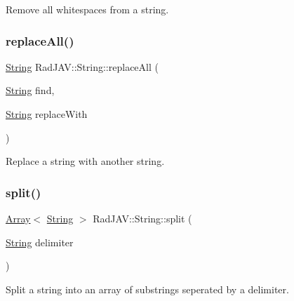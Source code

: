 Remove all whitespaces from a string. 

\mbox{\label{class_rad_j_a_v_1_1_string_a8631dd8fc8ed789ab959315f7e73ddb4}} 
\subsubsection{\texorpdfstring{replace\+All()}{replaceAll()}}
{\footnotesize\ttfamily \mbox{\hyperlink{class_rad_j_a_v_1_1_string}{String}} Rad\+J\+A\+V\+::\+String\+::replace\+All (\begin{DoxyParamCaption}\item[{\mbox{\hyperlink{class_rad_j_a_v_1_1_string}{String}}}]{find,  }\item[{\mbox{\hyperlink{class_rad_j_a_v_1_1_string}{String}}}]{replace\+With }\end{DoxyParamCaption})}



Replace a string with another string. 

\mbox{\label{class_rad_j_a_v_1_1_string_a64030b61ade099d5b084288d8f6b211a}} 
\subsubsection{\texorpdfstring{split()}{split()}}
{\footnotesize\ttfamily \mbox{\hyperlink{class_rad_j_a_v_1_1_array}{Array}}$<$ \mbox{\hyperlink{class_rad_j_a_v_1_1_string}{String}} $>$ Rad\+J\+A\+V\+::\+String\+::split (\begin{DoxyParamCaption}\item[{\mbox{\hyperlink{class_rad_j_a_v_1_1_string}{String}}}]{delimiter }\end{DoxyParamCaption})}



Split a string into an array of substrings seperated by a delimiter. 

\mbox{\label{class_rad_j_a_v_1_1_string_aa2a6f4181fca6f1c999b8f9e3e098d9e}} 
